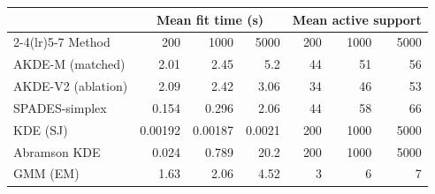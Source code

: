 \begin{tabular}{lrrrrrr}
\toprule
& \multicolumn{3}{c}{Mean fit time (s)} & \multicolumn{3}{c}{Mean active support} \\
\cmidrule(lr){2-4}\cmidrule(lr){5-7}
Method & 200 & 1000 & 5000 & 200 & 1000 & 5000 \\
\midrule
AKDE-M (matched) & 2.01 & 2.45 & 5.2 & 44 & 51 & 56 \\
AKDE-V2 (ablation) & 2.09 & 2.42 & 3.06 & 34 & 46 & 53 \\
SPADES-simplex & 0.154 & 0.296 & 2.06 & 44 & 58 & 66 \\
KDE (SJ) & 0.00192 & 0.00187 & 0.0021 & 200 & 1000 & 5000 \\
Abramson KDE & 0.024 & 0.789 & 20.2 & 200 & 1000 & 5000 \\
GMM (EM) & 1.63 & 2.06 & 4.52 & 3 & 6 & 7 \\
\bottomrule
\end{tabular}